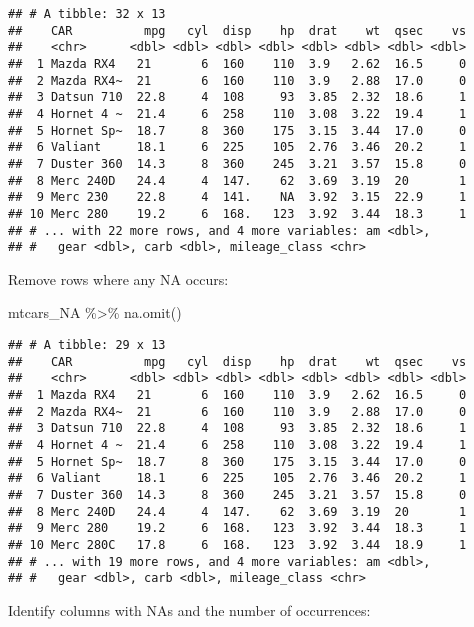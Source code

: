 \documentclass[
]{book}
\newenvironment{Shaded}{\begin{snugshade}}{\end{snugshade}}
\newcommand{\FunctionTok}[1]{\textcolor[rgb]{0.00,0.00,0.00}{#1}}
\newcommand{\NormalTok}[1]{#1}
\newcommand{\SpecialCharTok}[1]{\textcolor[rgb]{0.00,0.00,0.00}{#1}}
\begin{document}
\begin{verbatim}
## # A tibble: 32 x 13
##    CAR          mpg   cyl  disp    hp  drat    wt  qsec    vs
##    <chr>      <dbl> <dbl> <dbl> <dbl> <dbl> <dbl> <dbl> <dbl>
##  1 Mazda RX4   21       6  160    110  3.9   2.62  16.5     0
##  2 Mazda RX4~  21       6  160    110  3.9   2.88  17.0     0
##  3 Datsun 710  22.8     4  108     93  3.85  2.32  18.6     1
##  4 Hornet 4 ~  21.4     6  258    110  3.08  3.22  19.4     1
##  5 Hornet Sp~  18.7     8  360    175  3.15  3.44  17.0     0
##  6 Valiant     18.1     6  225    105  2.76  3.46  20.2     1
##  7 Duster 360  14.3     8  360    245  3.21  3.57  15.8     0
##  8 Merc 240D   24.4     4  147.    62  3.69  3.19  20       1
##  9 Merc 230    22.8     4  141.    NA  3.92  3.15  22.9     1
## 10 Merc 280    19.2     6  168.   123  3.92  3.44  18.3     1
## # ... with 22 more rows, and 4 more variables: am <dbl>,
## #   gear <dbl>, carb <dbl>, mileage_class <chr>
\end{verbatim}

Remove rows where any NA occurs:

\begin{Shaded}
\begin{Highlighting}[]
\NormalTok{mtcars\_NA }\SpecialCharTok{\%\textgreater{}\%} \FunctionTok{na.omit}\NormalTok{()}
\end{Highlighting}
\end{Shaded}

\begin{verbatim}
## # A tibble: 29 x 13
##    CAR          mpg   cyl  disp    hp  drat    wt  qsec    vs
##    <chr>      <dbl> <dbl> <dbl> <dbl> <dbl> <dbl> <dbl> <dbl>
##  1 Mazda RX4   21       6  160    110  3.9   2.62  16.5     0
##  2 Mazda RX4~  21       6  160    110  3.9   2.88  17.0     0
##  3 Datsun 710  22.8     4  108     93  3.85  2.32  18.6     1
##  4 Hornet 4 ~  21.4     6  258    110  3.08  3.22  19.4     1
##  5 Hornet Sp~  18.7     8  360    175  3.15  3.44  17.0     0
##  6 Valiant     18.1     6  225    105  2.76  3.46  20.2     1
##  7 Duster 360  14.3     8  360    245  3.21  3.57  15.8     0
##  8 Merc 240D   24.4     4  147.    62  3.69  3.19  20       1
##  9 Merc 280    19.2     6  168.   123  3.92  3.44  18.3     1
## 10 Merc 280C   17.8     6  168.   123  3.92  3.44  18.9     1
## # ... with 19 more rows, and 4 more variables: am <dbl>,
## #   gear <dbl>, carb <dbl>, mileage_class <chr>
\end{verbatim}

Identify columns with NAs and the number of occurrences:
\end{document}
